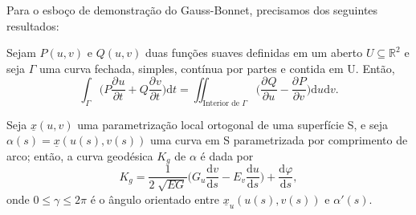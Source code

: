 \documentclass[../differential_geometry.tex]{subfiles}
\begin{document}
Para o esboço de demonstração do Gauss-Bonnet, precisamos dos seguintes resultados:
\hypertarget{green_theorem}{
	\begin{theorem*}
		Sejam \(P(u, v)\) e \(Q(u, v)\) duas funções suaves definidas em um aberto \(U\subseteq \mathbb{R}^{2}\) e seja \(\Gamma \) uma curva fechada, simples, contínua por partes e contida em U. Então,
		\[
			\int_{\Gamma }^{}\biggl(P \frac{\partial^{}u}{\partial t^{}} + Q \frac{\partial^{}v}{\partial t^{}}\biggr) \mathrm{d}t = \iint_{\text{Interior de }\Gamma }\biggl(\frac{\partial^{}Q}{\partial u^{}} - \frac{\partial^{}P}{\partial v^{}}\biggr)\mathrm{d}u\mathrm{d}v.
		\]
	\end{theorem*}
}
\begin{prop*}
	Seja \(\underline{x}(u, v)\) uma parametrização local ortogonal de uma superfície S, e seja \(\alpha (s) = \underline{x}(u(s), v(s))\) uma curva em S parametrizada por comprimento de arco; então, a curva geodésica \(K_g\) de \(\alpha \) é dada por
	\[
		K_g = \frac{1}{2\sqrt[]{EG}}\biggl(G_u \frac{\mathrm{d}v}{\mathrm{d}s} - E_v \frac{\mathrm{d}u}{\mathrm{d}s}\biggr) + \frac{\mathrm{d}\varphi }{\mathrm{d}s},
	\]
	onde \(0\leq \gamma \leq 2\pi \) é o ângulo orientado entre \(\underline{x}_u(u(s), v(s))\) e \(\alpha '(s).\)
\end{prop*}
\end{document}

